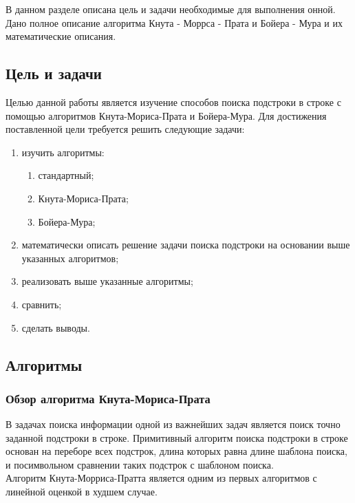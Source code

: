 \documentclass[../main.tex]{subfiles}
\begin{document}
	
	В данном разделе описана цель и задачи необходимые для выполнения онной. Дано полное описание алгоритма Кнута - Моррса - Прата и Бойера - Мура и их математические описания.
	
\subsection{Цель и задачи}

	Целью данной работы является изучение способов поиска подстроки в строке с помощью алгоритмов Кнута-Мориса-Прата и Бойера-Мура. 
	Для достижения поставленной цели требуется решить следующие задачи:
	
	\begin{enumerate}
		\item изучить алгоритмы:
		\begin{enumerate}
			\item стандартный;
			\item Кнута-Мориса-Прата;
			\item Бойера-Мура;
		\end{enumerate}
		\item математически описать решение задачи поиска подстроки на основании выше указанных алгоритмов;
		\item реализовать выше указанные алгоритмы;
		\item сравнить;
		\item сделать выводы.
	\end{enumerate}
	
\subsection{Алгоритмы}

\subsubsection{Обзор алгоритма Кнута-Мориса-Прата}

	В задачах поиска информации одной из важнейших задач является поиск точно заданной подстроки в строке. 
	Примитивный алгоритм поиска подстроки в строке основан на переборе всех подстрок, длина которых равна длине шаблона поиска, и посимвольном сравнении таких подстрок с шаблоном поиска. \\
	
	Алгоритм Кнута-Морриса-Пратта является одним из первых алгоритмов с линейной оценкой в худшем случае. \\
	
\end{document}
